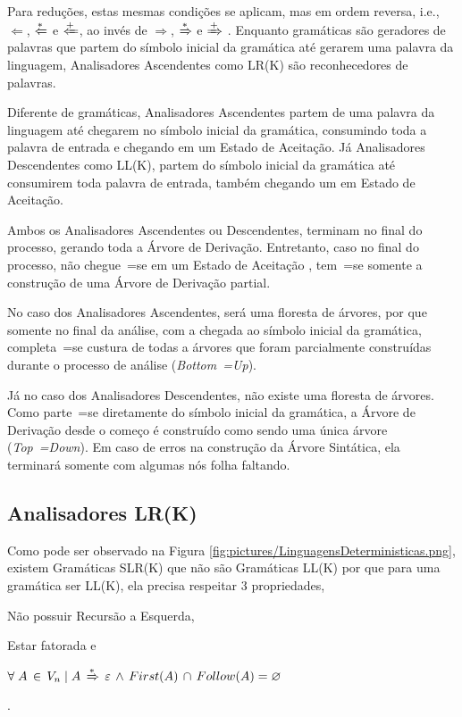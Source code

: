 {    Para reduções,
    estas mesmas condições se aplicam,
    mas em ordem reversa,
    i.e., $\Leftarrow$, $\xLeftarrow{*}$ e $\xLeftarrow{+}$,
    ao invés de $\Rightarrow$,
    $\xRightarrow{*}$ e
    $\xRightarrow{+}$ \cite{ahoCompilerDragonBook}.
    Enquanto gramáticas são geradores de palavras que partem do símbolo inicial da gramática até gerarem uma palavra da linguagem,
    Analisadores Ascendentes como LR(K) são reconhecedores de palavras.

    Diferente de gramáticas,
    Analisadores Ascendentes partem de uma palavra da linguagem até chegarem no símbolo inicial da gramática,
    consumindo toda a palavra de entrada e
    chegando em um Estado de Aceitação.
    Já Analisadores Descendentes como LL(K),
    partem do símbolo inicial da gramática até consumirem toda palavra de entrada,
    também chegando um em Estado de Aceitação.

    Ambos os Analisadores Ascendentes ou
    Descendentes,
    terminam no final do processo,
    gerando toda a Árvore de Derivação.
    Entretanto,
    caso no final do processo,
    não chegue~=se em um Estado de Aceitação \cite{ahoCompilerDragonBook},
    tem~=se somente a construção de uma Árvore de Derivação partial.

    No caso dos Analisadores Ascendentes,
    será uma floresta de árvores,
    por que somente no final da análise,
    com a chegada ao símbolo inicial da gramática,
    completa~=se custura de todas a árvores que foram parcialmente construídas durante o processo de análise (\textit{Bottom~=Up}).

    Já no caso dos Analisadores Descendentes,
    não existe uma floresta de árvores.
    Como parte~=se diretamente do símbolo inicial da gramática,
    a Árvore de Derivação desde o começo é construído como sendo uma única árvore (\textit{Top~=Down}).
    Em caso de erros na construção da Árvore Sintática,
    ela terminará somente com algumas nós folha faltando.


\subsection{Analisadores LR(K)}

    Como pode ser observado na Figura \ref{fig:pictures/LinguagensDeterministicas.png},
    existem Gramáticas SLR(K) que não são Gramáticas LL(K) por que para uma gramática ser LL(K),
    ela precisa respeitar 3 propriedades,
    \begin{inparaenum}
        \item Não possuir Recursão a Esquerda,
        \item Estar fatorada e
        \item $\forall\; A\, \in\, V_n\; |\; A\,
                \xRightarrow{*}\, \varepsilon\,
                \land\, First(A)\, \cap\, Follow(A) = \varnothing$
    \end{inparaenum}
    \cite{ahoCompilerDragonBook}.

}
